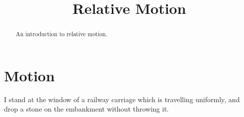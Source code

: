 \documentclass{ximera}
\title{Relative Motion}
\begin{document}
\begin{abstract}
An introduction to relative motion.
\end{abstract}
\maketitle

\section{Motion}

I stand at the window of a railway carriage which is travelling uniformly, and drop a stone on the embankment without throwing it.
\end{document}
